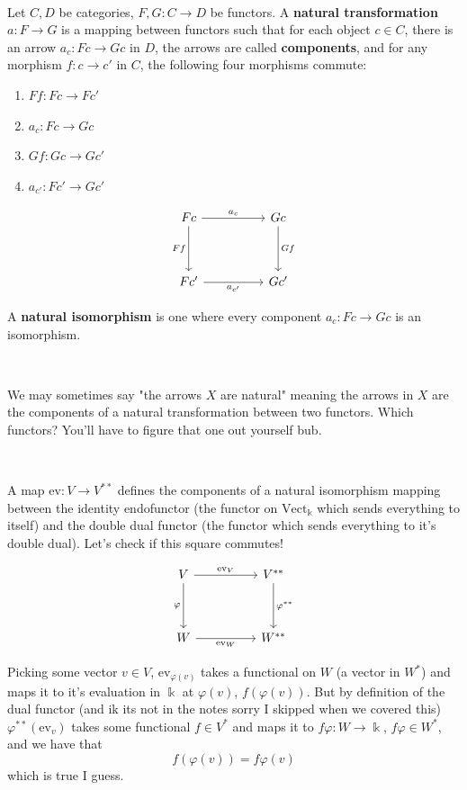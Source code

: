 \documentclass{article}
\begin{document}
\begin{definition}
\

Let $C,D$ be categories, $F,G: C \to D$ be functors. A \textbf{natural transformation} $a: F \to G$ is a mapping between functors such that for each object $c \in C$, there is an arrow $a_c: Fc \to Gc$ in $D$, the arrows are called \textbf{components}, and for any morphism $f: c \to c'$ in $C$, the following four morphisms commute: 

\begin{enumerate}
    \item $Ff: Fc \to Fc'$
    \item $a_c: Fc \to Gc$
    \item $Gf: Gc \to Gc'$
    \item $a_{c'}: Fc' \to Gc'$
\end{enumerate}

\[\begin{tikzcd}
	Fc && Gc \\
	\\
	{Fc'} && {Gc'}
	\arrow["{a_c}", from=1-1, to=1-3]
	\arrow["Ff"', from=1-1, to=3-1]
	\arrow["Gf", from=1-3, to=3-3]
	\arrow["{a_{c'}}"', from=3-1, to=3-3]
\end{tikzcd}\]

A \textbf{natural isomorphism} is one where every component $a_c: Fc \to Gc$ is an isomorphism.  
\end{definition}

\begin{remark}
\

We may sometimes say "the arrows $X$ are natural" meaning the arrows in $X$ are the components of a natural transformation between two functors. Which functors? You'll have to figure that one out yourself bub.
\end{remark}

\begin{example}
\

A map $\text{ev}: V \to V^{**}$ defines the components of a natural isomorphism mapping between the identity endofunctor (the functor on $\text{Vect}_\Bbbk$ which sends everything to itself) and the double dual functor (the functor which sends everything to it's double dual). Let's check if this square commutes!

\[\begin{tikzcd}
	V && V^{**} \\
	\\
	{W} && {W^{**}}
	\arrow["{\text{ev}_V}", from=1-1, to=1-3]
	\arrow["{\varphi}"', from=1-1, to=3-1]
	\arrow["{\varphi^{**}}", from=1-3, to=3-3]
	\arrow["{\text{ev}_W}"', from=3-1, to=3-3]
\end{tikzcd}\]

Picking some vector $v \in V$, $\text{ev}_{\varphi(v)}$ takes a functional on $W$ (a vector in $W^*$) and maps it to it's evaluation in $\Bbbk$ at $\varphi(v)$, $f(\varphi(v))$. But by definition of the dual functor (and ik its not in the notes sorry I skipped when we covered this) $\varphi^{**}(\text{ev}_v)$ takes some functional $f \in V^*$ and maps it to $f\varphi: W \to \Bbbk$, $f\varphi \in W^*$, and we have that $$f(\varphi(v)) = f\varphi(v)$$which is true I guess.
\end{example}
\end{document}
